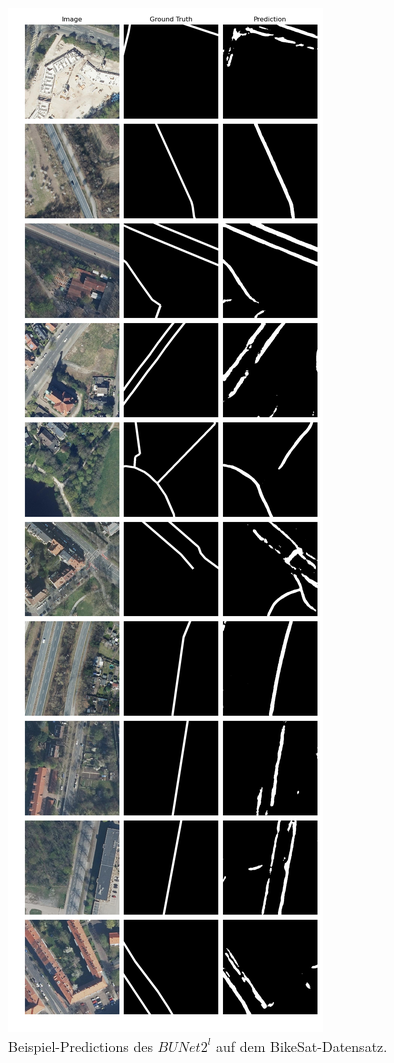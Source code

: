 \begin{figure}
	\centering
	\includegraphics[width=.41\textwidth]{Bilder/Samples-BikeSat/bunet2-l.png} 
	\caption{Beispiel-Predictions des $BUNet2^l$ auf dem BikeSat-Datensatz.}
	\label{fig:bikesat-samples-bunet2-l}
\end{figure}

